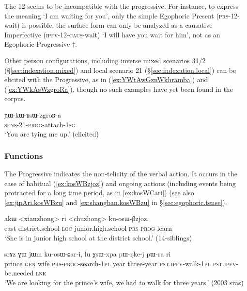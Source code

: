 The 1\fl{}2  seems to be incompatible with the progressive. For instance, to express the meaning `I am waiting for you', only the simple Egophoric Present  (\textsc{prs}-1\fl{}2-wait) is possible, the surface form  can only be analyzed as a causative Imperfective  (\textsc{ipfv}-1\fl{}2-\textsc{caus}-wait) `I will have you wait for him', not as an Egophoric Progressive $\dagger$.

Other person configurations, including inverse mixed scenarios 3\fl{}1/2 (§\ref{sec:indexation.mixed}) and local scenario 2\fl{}1 (§\ref{sec:indexation.local}) can be elicited with the Progressive, as in (\ref{ex:YWtAwGznWkhramba}) and (\ref{ex:YWkAsWzgroRa}), though no such examples have yet been found in the corpus.

\begin{exe}
\ex \label{ex:YWkAsWzgroRa}
\gll ɲɯ-kɯ-ɤsɯ-zgroʁ-a \\
\textsc{sens}-2\fl{}1-\textsc{prog}-attach-\textsc{1sg} \\
\glt `You are tying me up.' (elicited)
 \end{exe}
 
\subsubsection{Functions} \label{sec:progressive.function}
\largerpage
The Progressive indicates the non-telicity of the verbal action. It occurs in the case of habitual (\ref{ex:kosWBzjoz}) and ongoing actions (including events being protracted for a long time period, as in \ref{ex:kosWCari}) (see also \ref{ex:jipAri.kosWBzu} and \ref{ex:shangban.kosWBzu} in §\ref{sec:egophoric.tense}).

\begin{exe}
\ex \label{ex:kosWBzjoz}
\gll  akɯ <xianzhong> ri <chuzhong> ku-osɯ-βzjoz. \\
east district.school \textsc{loc} junior.high.school \textsc{prs}-\textsc{prog}-learn \\
\glt `She is in junior high school at the district school.' (14-siblings) 
 \end{exe}

\begin{exe}
\ex \label{ex:kosWCari}
\gll srɤz ɣɯ jɯm ku-osɯ-ɕar-i, lu χsɯ-xpa pɯ-ŋke-j pɯ-ra ri  \\
prince \textsc{gen} wife \textsc{prs}-\textsc{prog}-search-\textsc{1pl} year three-year \textsc{pst}.\textsc{ipfv}-walk-\textsc{1pl} \textsc{pst}.\textsc{ipfv}-be.needed \textsc{lnk} \\
\glt `We are looking for the prince's wife, we had to walk for three years.'  (2003 sras)
 \end{exe}


